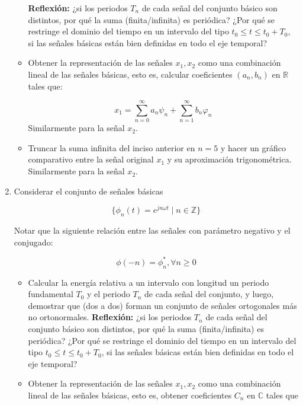 \documentclass[12pt,a4paper]{report}
\begin{document}
\begin{enumerate}[label=\alph*)]
\begin{itemize}
      \textbf{Reflexión:} ¿si los periodos $T_n$ de cada señal del conjunto básico son distintos, por qué la suma 
      (finita/infinita) es periódica? ¿Por qué se restringe el dominio del tiempo en un intervalo del tipo 
      $t_0 \leq t \leq t_0 + T_0$, si las señales básicas están bien definidas en todo el eje temporal?

   \item Obtener la representación de las señales $x_1, x_2$ como una combinación lineal de las señales básicas, 
     esto es, calcular coeficientes $(a_n, b_n)$ en $\mathbb{R}$ tales que:

     $$x_1 = \sum_{n=0}^{\infty} a_n \psi_n + \sum_{n=1}^{\infty} b_n \varphi_n$$
     Similarmente para la señal $x_2$.

   \item Truncar la suma infinita del inciso anterior en $n = 5$ y hacer un gráfico comparativo entre la señal 
     original $x_1$ y su aproximación trigonométrica. Similarmente para la señal $x_2$.

  \end{itemize}

  \item Considerar el conjunto de señales básicas

  $$\{\phi_n(t) = e^{jn\omega t} \mid n \in \mathbb{Z}\}$$

  Notar que la siguiente relación entre las señales con parámetro negativo y el conjugado:

  $$\phi(-n) = \phi_n^*, \forall n \geq 0$$

  \begin{itemize}

    \item Calcular la energía relativa a un intervalo con longitud un periodo fundamental $T_0$ y el periodo $T_n$ de
      cada señal del conjunto, y luego, demostrar que (dos a dos) forman un conjunto de señales ortogonales más no
      ortonormales.\newline
      \textbf{Reflexión:} ¿si los periodos $T_n$ de cada señal del conjunto básico son distintos, por qué la suma
      (finita/infinita) es periódica? ¿Por qué se restringe el dominio del tiempo en un intervalo del tipo 
      $t_0 \leq t \leq t_0 + T_0$, si las señales básicas están bien definidas en todo el eje temporal?

    \item Obtener la representación de las señales $x_1, x_2$ como una combinación lineal de las señales básicas, esto 
      es, obtener coeficientes $C_n$ en $\mathbb{C}$ tales que


\end{itemize}
\end{enumerate}
\end{document}
